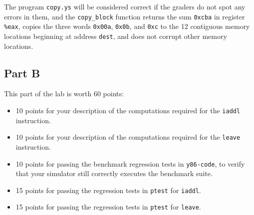 \documentclass[11pt]{article}
\begin{document}
The program \texttt{copy.ys} will be considered correct if 
the graders do not spot any errors in them, 
and the
\texttt{copy\_block} 
function returns the sum \texttt{0xcba} in register \texttt{\%eax},
copies the three words \texttt{0x00a}, \texttt{0x0b}, and
\texttt{0xc} to the 12 contiguous memory locations beginning at 
address {\tt dest}, and does not corrupt other memory locations.

\subsection*{Part B}

This part of the lab is worth 60 points: 
\begin{itemize}
\item 10 points for your description of the computations required 
for the {\tt iaddl} instruction.
\item 10 points for your description of the computations required
for the {\tt leave} instruction.
\item 10 points for passing the benchmark regression tests in
\texttt{y86-code}, to verify that your simulator still correctly
executes the benchmark suite.
\item 15 points for passing the regression tests in {\tt ptest} 
for {\tt iaddl}.
\item 15 points for passing the regression tests in {\tt ptest}
for {\tt leave}.
\end{itemize}
\end{document}
